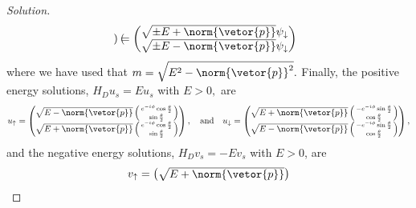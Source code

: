 \begin{proof}[Solution]
\begin{equation*}
\begin{pmatrix}
      \end{pmatrix}
      =
      \begin{pmatrix}
         \sqrt{\pm E + \norm{\vetor{p}}} \psi_{\downarrow}\\
         \sqrt{\pm E - \norm{\vetor{p}}} \psi_{\downarrow}
      \end{pmatrix}
   \end{equation*}
   where we have used that \(m = \sqrt{E^2 - \norm{\vetor{p}}^2}.\) Finally, the positive energy solutions, \(H_D u_s = E u_s\) with \(E > 0,\) are
   \begin{equation*}
      u_\uparrow = \begin{pmatrix}
         \sqrt{E - \norm{\vetor{p}}} 
         \left(\begin{smallmatrix}
             e^{-i\phi} \cos\frac\theta2\\
             \sin\frac\theta2
         \end{smallmatrix}\right)\\
         \sqrt{E + \norm{\vetor{p}}}
         \left(\begin{smallmatrix}
             e^{-i\phi} \cos\frac\theta2\\
             \sin\frac\theta2
         \end{smallmatrix}\right)\\
      \end{pmatrix},
      \quad\text{and}\quad
      u_\downarrow = \begin{pmatrix}
         \sqrt{E + \norm{\vetor{p}}} 
         \left(\begin{smallmatrix}
             -e^{-i\phi} \sin\frac\theta2\\
             \cos\frac\theta2
         \end{smallmatrix}\right)\\
         \sqrt{E - \norm{\vetor{p}}}
         \left(\begin{smallmatrix}
             -e^{-i\phi} \sin\frac\theta2\\
             \cos\frac\theta2
         \end{smallmatrix}\right)\\
      \end{pmatrix},
   \end{equation*}
   and the negative energy solutions, \(H_D v_s = - E v_s\) with \(E > 0\), are
   \begin{equation*}
      v_\uparrow = \begin{pmatrix}
         \sqrt{E + \norm{\vetor{p}}} 

\end{pmatrix}
\end{equation*}
\end{proof}
